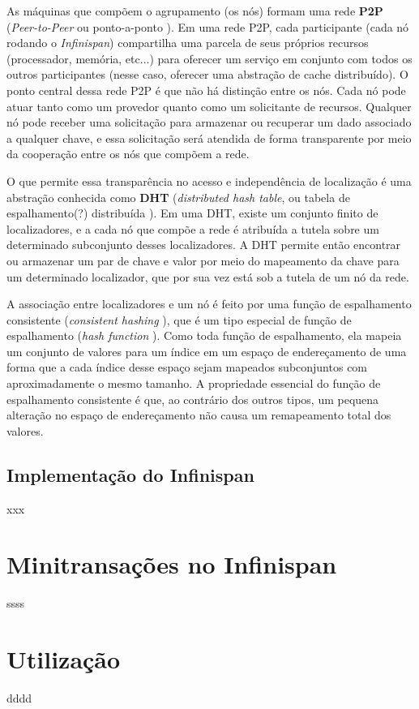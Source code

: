 \documentclass[11pt,twoside,a4paper]{book}
\renewcommand{\chaptermark}[1]{\markboth{\MakeUppercase{#1}}{}}
\begin{document}
As máquinas que compõem o agrupamento (os nós) formam uma rede \textbf{P2P} (\emph{Peer-to-Peer} ou ponto-a-ponto \cite{p2p}). Em uma rede P2P, cada participante (cada nó rodando o \emph{Infinispan}) compartilha uma parcela de seus próprios recursos (processador, memória, 
etc...) para oferecer um serviço em conjunto com todos os outros participantes (nesse caso, oferecer uma abstração de cache distribuído).
O ponto central dessa rede P2P é que não há distinção entre os nós. Cada nó pode atuar tanto como um provedor quanto como um solicitante de recursos. Qualquer nó pode receber uma solicitação para armazenar ou recuperar um dado associado a qualquer chave, e essa solicitação será atendida de forma transparente por meio da cooperação entre os nós que compõem a rede.

O que permite essa transparência no acesso e independência de localização é uma abstração conhecida como \textbf{DHT} (\emph{distributed hash table}, ou tabela de espalhamento(?) distribuída \cite{dht}). Em uma DHT, existe um conjunto finito de localizadores, e a cada nó que compõe a rede é atribuída a tutela sobre um determinado subconjunto desses localizadores. A DHT permite então encontrar ou armazenar um par de chave e valor por meio do mapeamento da chave para um determinado localizador, que por sua vez está sob a tutela de um nó da rede.

A associação entre localizadores e um nó é feito por uma função de espalhamento consistente (\emph{consistent hashing} \cite{consistent-hashing}), que é um tipo especial de função de espalhamento (\emph{hash function} \cite{taocp_3}). Como toda função de espalhamento, ela mapeia um conjunto de valores para um índice em um espaço de endereçamento de uma forma que a cada índice desse espaço sejam mapeados subconjuntos com aproximadamente o mesmo tamanho. A propriedade essencial do função de espalhamento consistente é que, ao contrário dos outros tipos, um pequena alteração no espaço de endereçamento não causa um remapeamento total dos valores.

\subsection{Implementação do Infinispan}
\label{sec:implementacao_infinispan}
xxx

\section{Minitransações no Infinispan}
\label{sec:mt_infinispan}
ssss

\section{Utilização}
\label{sec:utilizacao}
dddd

\renewcommand{\chaptermark}[1]{\markboth{\MakeUppercase{\appendixname\ \thechapter}} {\MakeUppercase{#1}} }
\fancyhead[RE,LO]{}
\appendix

\backmatter \singlespacing   %
\end{document}
